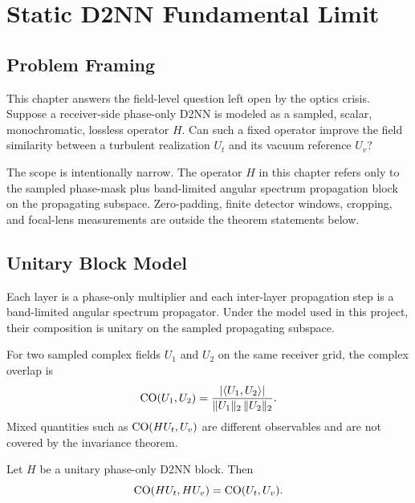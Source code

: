 \chapter{Static D2NN Fundamental Limit}

\section{Problem Framing}

This chapter answers the field-level question left open by the optics crisis.
Suppose a receiver-side phase-only D2NN is modeled as a sampled, scalar,
monochromatic, lossless operator $H$. Can such a fixed operator improve the
field similarity between a turbulent realization $U_t$ and its vacuum reference
$U_v$?

The scope is intentionally narrow. The operator $H$ in this chapter refers only
to the sampled phase-mask plus band-limited angular spectrum propagation block
on the propagating subspace. Zero-padding, finite detector windows, cropping,
and focal-lens measurements are outside the theorem statements below.

\section{Unitary Block Model}

Each layer is a phase-only multiplier and each inter-layer propagation step is a
band-limited angular spectrum propagator. Under the model used in this project,
their composition is unitary on the sampled propagating subspace.

\begin{definition}
For two sampled complex fields $U_1$ and $U_2$ on the same receiver grid, the
complex overlap is
\begin{equation}
\mathrm{CO}(U_1,U_2)=
\frac{|\langle U_1,U_2\rangle|}{\|U_1\|_2\,\|U_2\|_2}.
\end{equation}
Mixed quantities such as $\mathrm{CO}(HU_t,U_v)$ are different observables and are not
covered by the invariance theorem.
\end{definition}

\begin{theorem}
Let $H$ be a unitary phase-only D2NN block. Then
\begin{equation}
\mathrm{CO}(HU_t, HU_v) = \mathrm{CO}(U_t, U_v).
\end{equation}
\end{theorem}

